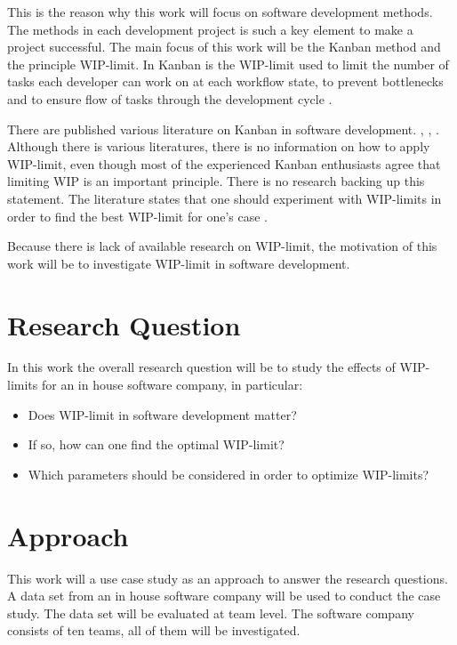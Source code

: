 \documentclass[UKenglish]{ifimaster}  %
\begin{document}
This is the reason why this work will focus on software development methods. The methods in each development project is such a key element to make a project successful. The main focus of this work will be the Kanban method and the principle WIP-limit. In Kanban is the WIP-limit used to  limit the number of tasks each developer can work on at each workflow state, to prevent bottlenecks and to ensure flow of tasks through the development cycle \parencite{gandomani2013important} \parencite{ikonen2010exploring}.

There are published various literature on Kanban in software development. \parencite{0984521402},   \parencite{Kniberg}, \parencite{Joyce}. Although there is various literatures, there is no information on how to apply WIP-limit, even though most of the experienced Kanban enthusiasts agree that limiting WIP is an important principle.  There is no research backing up this statement.  The literature states that one should experiment with WIP-limits in order to find the best WIP-limit for one's case \parencite{Ikonen} \parencite{Kniberg}.

Because there is lack of available research on WIP-limit, the motivation of this work will be to investigate WIP-limit in software development.

\section{Research Question}
\label{chap:RQ}
In this work the overall research question will be to study the effects of WIP-limits for an in house software company, in particular:
\begin{itemize}
\item Does WIP-limit in software development matter?
\item If so, how can one find the optimal WIP-limit?
\item Which parameters should be considered in order to optimize WIP-limits? 
\end{itemize}


\section{Approach}
This work will a use case study as an approach  to answer the research questions.  A data set from an in house software company will be used to conduct the case study.  The data set will be evaluated at team level. The software company consists of ten teams, all of them will be investigated.
\end{document}
